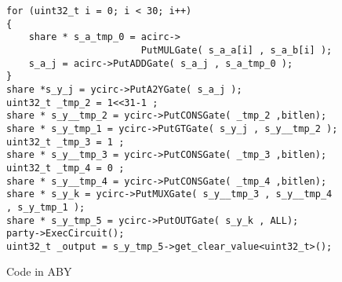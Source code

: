 \begin{figure}
\begin{verbatim}
for (uint32_t i = 0; i < 30; i++)
{
    share * s_a_tmp_0 = acirc->
    					PutMULGate( s_a_a[i] , s_a_b[i] );
    s_a_j = acirc->PutADDGate( s_a_j , s_a_tmp_0 );
}
share *s_y_j = ycirc->PutA2YGate( s_a_j );
uint32_t _tmp_2 = 1<<31-1 ;
share * s_y__tmp_2 = ycirc->PutCONSGate( _tmp_2 ,bitlen);
share * s_y_tmp_1 = ycirc->PutGTGate( s_y_j , s_y__tmp_2 );
uint32_t _tmp_3 = 1 ;
share * s_y__tmp_3 = ycirc->PutCONSGate( _tmp_3 ,bitlen);
uint32_t _tmp_4 = 0 ;
share * s_y__tmp_4 = ycirc->PutCONSGate( _tmp_4 ,bitlen);
share * s_y_k = ycirc->PutMUXGate( s_y__tmp_3 , s_y__tmp_4 , s_y_tmp_1 );
share * s_y_tmp_5 = ycirc->PutOUTGate( s_y_k , ALL);
party->ExecCircuit();
uint32_t _output = s_y_tmp_5->get_clear_value<uint32_t>();
\end{verbatim}
\caption{Code in ABY}
\label{fig:ex-aby}
\end{figure}
